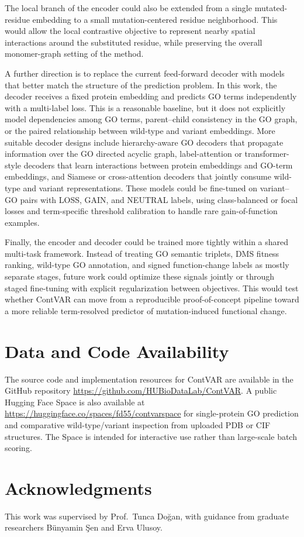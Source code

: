 \documentclass[11pt,a4paper]{article}
\begin{document}
The local branch of the encoder could also be extended from a single mutated-residue embedding to a small mutation-centered residue neighborhood. This would allow the local contrastive objective to represent nearby spatial interactions around the substituted residue, while preserving the overall monomer-graph setting of the method.

A further direction is to replace the current feed-forward decoder with models that better match the structure of the prediction problem. In this work, the decoder receives a fixed protein embedding and predicts GO terms independently with a multi-label loss. This is a reasonable baseline, but it does not explicitly model dependencies among GO terms, parent--child consistency in the GO graph, or the paired relationship between wild-type and variant embeddings. More suitable decoder designs include hierarchy-aware GO decoders that propagate information over the GO directed acyclic graph, label-attention or transformer-style decoders that learn interactions between protein embeddings and GO-term embeddings, and Siamese or cross-attention decoders that jointly consume wild-type and variant representations. These models could be fine-tuned on variant--GO pairs with LOSS, GAIN, and NEUTRAL labels, using class-balanced or focal losses and term-specific threshold calibration to handle rare gain-of-function examples.

Finally, the encoder and decoder could be trained more tightly within a shared multi-task framework. Instead of treating GO semantic triplets, DMS fitness ranking, wild-type GO annotation, and signed function-change labels as mostly separate stages, future work could optimize these signals jointly or through staged fine-tuning with explicit regularization between objectives. This would test whether ContVAR can move from a reproducible proof-of-concept pipeline toward a more reliable term-resolved predictor of mutation-induced functional change.

\section*{Data and Code Availability}

The source code and implementation resources for ContVAR are available in the GitHub repository \url{https://github.com/HUBioDataLab/ContVAR}. A public Hugging Face Space is also available at \url{https://huggingface.co/spaces/fd55/contvarspace} for single-protein GO prediction and comparative wild-type/variant inspection from uploaded PDB or CIF structures. The Space is intended for interactive use rather than large-scale batch scoring.

\section*{Acknowledgments}

This work was supervised by Prof.\ Tunca Do\u{g}an, with guidance from graduate researchers B\"unyamin \c{S}en and Erva Ulusoy.



\end{document}
